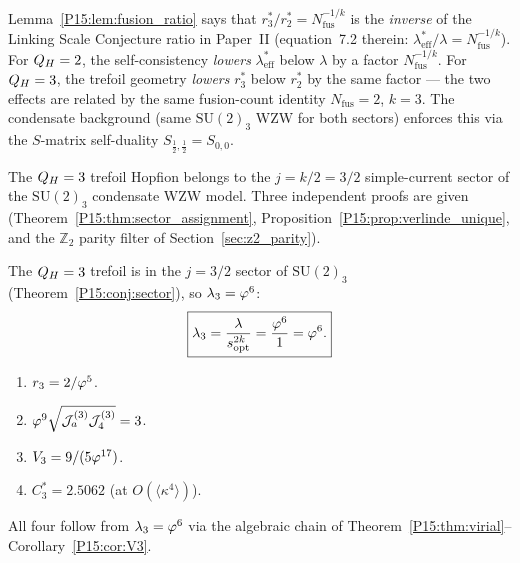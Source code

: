 \begin{remark}
\label{P15:rem:fusion_ratio_interp}
Lemma~\ref{P15:lem:fusion_ratio} says that $r_3^*/r_2^* = N_\mathrm{fus}^{-1/k}$ is the
\emph{inverse} of the Linking Scale Conjecture ratio in Paper~II
(equation~7.2 therein: $\lambda_{\mathrm{eff}}^*/\lambda = N_{\mathrm{fus}}^{-1/k}$).
For $Q_H=2$, the self-consistency \emph{lowers} $\lambda_{\mathrm{eff}}^*$ below $\lambda$
by a factor $N_{\mathrm{fus}}^{-1/k}$.
For $Q_H=3$, the trefoil geometry \emph{lowers} $r_3^*$ below $r_2^*$
by the same factor --- the two effects are related by the same
fusion-count identity $N_{\mathrm{fus}}=2$, $k=3$.
The condensate background (same $\mathrm{SU}(2)_3$ WZW for both sectors)
enforces this via the $S$-matrix self-duality $S_{\frac12,\frac12}=S_{0,0}$.
\end{remark}

\begin{theorem}[Simple-current sector assignment]
\label{P15:conj:sector}
The $Q_H=3$ trefoil Hopfion belongs to the $j=k/2=3/2$ simple-current
sector of the $\mathrm{SU}(2)_3$ condensate WZW model.
Three independent proofs are given (Theorem~\ref{P15:thm:sector_assignment},
Proposition~\ref{P15:prop:verlinde_unique}, and the $\mathbb{Z}_2$ parity
filter of Section~\ref{sec:z2_parity}).
\end{theorem}

\begin{theorem}[$\lam_3=\vp^6$]
\label{P15:thm:lambda3_sc}
The $Q_H=3$ trefoil is in the $j=3/2$ sector of $\mathrm{SU}(2)_3$
(Theorem~\ref{P15:conj:sector}), so $\lam_3 = \vp^6$:
\begin{equation}
  \boxed{\lambda_3 = \frac{\lambda}{s_{\mathrm{opt}}^{2k}} = \frac{\varphi^6}{1} = \varphi^6.}
  \label{P15:eq:lambda3_proved}
\end{equation}
\end{theorem}

\begin{corollary}
\label{P15:cor:sc_consequences}
\begin{enumerate}[noitemsep,label=\textup{(\roman*)}]
\item $r_3 = 2/\varphi^5$.
\item $\varphi^9\sqrt{\mathcal{J}_a^{(3)}\mathcal{J}_4^{(3)}}=3$.
\item $V_3 = 9/(5\varphi^{17})$.
\item $C_3^* = 2.5062$ (at $O(\langle\kappa^4\rangle)$).
\end{enumerate}
All four follow from $\lam_3=\vp^6$ via the algebraic chain of
Theorem~\ref{P15:thm:virial}--Corollary~\ref{P15:cor:V3}.
\end{corollary}

